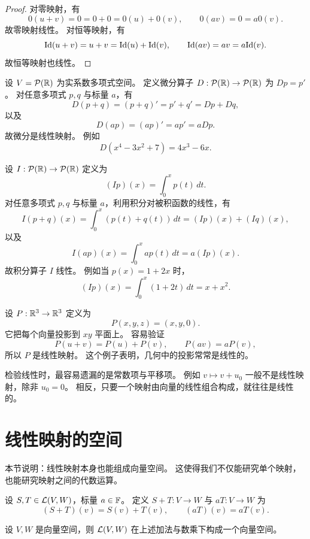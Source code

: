 \begin{proof} 对零映射，有 \[ 0(u+v)=0=0+0=0(u)+0(v),\qquad 0(av)=0=a0(v). \] 故零映射线性。 对恒等映射，有
\[ \mathrm{Id}(u+v)=u+v=\mathrm{Id}(u)+\mathrm{Id}(v),\qquad \mathrm{Id}(av)=av=a\mathrm{Id}(v). \] 故恒等映射也线性。 \end{proof}

\begin{example} 设 $V=\mathcal{P}(\mathbb{R})$ 为实系数多项式空间。 定义微分算子 $D:\mathcal{P}(\mathbb{R})\to\mathcal{P}(\mathbb{R})$ 为 $Dp=p'$。
对任意多项式 $p,q$ 与标量 $a$，有 \[ D(p+q)=(p+q)'=p'+q'=Dp+Dq, \] 以及 \[ D(ap)=(ap)'=ap'=aDp. \]
故微分是线性映射。 例如 \[ D(x^4-3x^2+7)=4x^3-6x. \] \end{example}

\begin{example} 设 $I:\mathcal{P}(\mathbb{R})\to\mathcal{P}(\mathbb{R})$ 定义为 \[ (Ip)(x)=\int_0^x p(t)\,dt. \] 对任意多项式
$p,q$ 与标量 $a$，利用积分对被积函数的线性，有 \[ I(p+q)(x)=\int_0^x (p(t)+q(t))\,dt=(Ip)(x)+(Iq)(x), \]
以及 \[ I(ap)(x)=\int_0^x ap(t)\,dt=a(Ip)(x). \] 故积分算子 $I$ 线性。 例如当 $p(x)=1+2x$ 时， \[
(Ip)(x)=\int_0^x (1+2t)\,dt=x+x^2. \] \end{example}

\begin{example} 设 $P:\mathbb{R}^3\to\mathbb{R}^3$ 定义为 \[ P(x,y,z)=(x,y,0). \] 它把每个向量投影到 $xy$ 平面上。 容易验证
\[ P(u+v)=P(u)+P(v),\qquad P(av)=aP(v), \] 所以 $P$ 是线性映射。 这个例子表明，几何中的投影常常是线性的。
\end{example}

\begin{remark} 检验线性时，最容易遗漏的是常数项与平移项。 例如 $v\mapsto v+u_0$ 一般不是线性映射，除非 $u_0=0$。
相反，只要一个映射由向量的线性组合构成，就往往是线性的。 \end{remark}

\section{线性映射的空间}

本节说明：线性映射本身也能组成向量空间。 这使得我们不仅能研究单个映射，也能研究映射之间的代数运算。

\begin{definition} 设 $S,T\in\mathcal{L}(V,W)$，标量 $a\in\mathbb{F}$。 定义 $S+T:V\to W$ 与 $aT:V\to W$ 为 \[
(S+T)(v)=S(v)+T(v),\qquad (aT)(v)=aT(v). \] \end{definition}

\begin{theorem} 设 $V,W$ 是向量空间，则 $\mathcal{L}(V,W)$ 在上述加法与数乘下构成一个向量空间。 \end{theorem}

